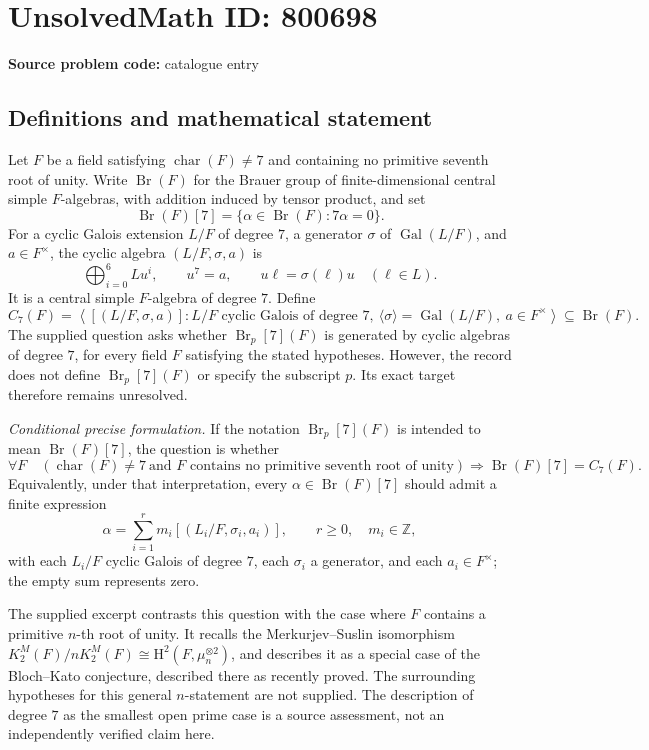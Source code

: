 \documentclass[11pt]{article}
\begin{document}
\section*{UnsolvedMath ID: 800698}
\textbf{Source problem code:} catalogue entry
\subsection{Definitions and mathematical statement}
Let \(F\) be a field satisfying \(\operatorname{char}(F)\ne 7\) and containing no primitive seventh root of unity. Write \(\operatorname{Br}(F)\) for the Brauer group of finite-dimensional central simple \(F\)-algebras, with addition induced by tensor product, and set
\[
\operatorname{Br}(F)[7]=\{\alpha\in\operatorname{Br}(F):7\alpha=0\}.
\]
For a cyclic Galois extension \(L/F\) of degree \(7\), a generator \(\sigma\) of \(\operatorname{Gal}(L/F)\), and \(a\in F^\times\), the cyclic algebra \((L/F,\sigma,a)\) is
\[
\bigoplus_{i=0}^{6}Lu^i,\qquad u^7=a,\qquad u\ell=\sigma(\ell)u\quad(\ell\in L).
\]
It is a central simple \(F\)-algebra of degree \(7\). Define
\[
C_7(F)=\left\langle[(L/F,\sigma,a)]:L/F\text{ cyclic Galois of degree }7,\ \langle\sigma\rangle=\operatorname{Gal}(L/F),\ a\in F^\times\right\rangle
\subseteq\operatorname{Br}(F).
\]
The supplied question asks whether \(\operatorname{Br}_{p}[7](F)\) is generated by cyclic algebras of degree \(7\), for every field \(F\) satisfying the stated hypotheses. However, the record does not define \(\operatorname{Br}_{p}[7](F)\) or specify the subscript \(p\). Its exact target therefore remains unresolved.

\emph{Conditional precise formulation.} If the notation \(\operatorname{Br}_{p}[7](F)\) is intended to mean \(\operatorname{Br}(F)[7]\), the question is whether
\[
\forall F\quad\left(\operatorname{char}(F)\ne7\ \text{and }F\text{ contains no primitive seventh root of unity}\right)
\Longrightarrow\operatorname{Br}(F)[7]=C_7(F).
\]
Equivalently, under that interpretation, every \(\alpha\in\operatorname{Br}(F)[7]\) should admit a finite expression
\[
\alpha=\sum_{i=1}^{r}m_i[(L_i/F,\sigma_i,a_i)],
\qquad r\ge0,\quad m_i\in\mathbb Z,
\]
with each \(L_i/F\) cyclic Galois of degree \(7\), each \(\sigma_i\) a generator, and each \(a_i\in F^\times\); the empty sum represents zero.

The supplied excerpt contrasts this question with the case where \(F\) contains a primitive \(n\)-th root of unity. It recalls the Merkurjev--Suslin isomorphism \(K^M_2(F)/nK^M_2(F)\cong\mathrm H^2(F,\mu_n^{\otimes2})\), and describes it as a special case of the Bloch--Kato conjecture, described there as recently proved. The surrounding hypotheses for this general \(n\)-statement are not supplied. The description of degree \(7\) as the smallest open prime case is a source assessment, not an independently verified claim here.
\end{document}
